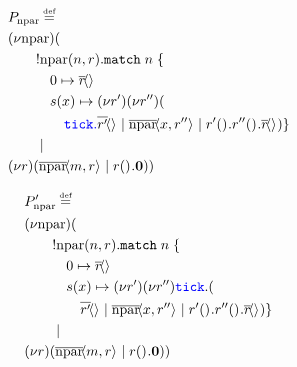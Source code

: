 \begin{minipage}{0.42\textwidth}
\begin{align*}
    &\kern0em P_{\text{npar}} \defeq\\
    &(\nu \text{npar})(\\
    &\kern2em !\text{npar}(n,r).\texttt{match}\; n\; \{\\
    &\kern3em 0 \mapsto \asyncoutputch{r}{}{}\\
    &\kern3em s(x) \mapsto (\nu r' )(\nu r'' )(\\
    &\kern4em {\color{blue} \tick{{\color{black} \asyncoutputch{r'}{}{}}} } \mid
 \asyncoutputch{\text{npar}}{x,r''}{} \mid \inputch{r'}{}{}{\inputch{r''}{}{}{\asyncoutputch{r}{}{}}}) \} \\
    &\kern2em \mid \\
    &(\nu r)( \asyncoutputch{\text{npar}}{m,r}{} \mid \inputch{r}{}{}{\nil} ))
\end{align*}
\end{minipage}
\begin{minipage}{0.42\textwidth}
\begin{align*}
    &\kern0em P_{\text{npar}}' \defeq\\
    &(\nu \text{npar})(\\
    &\kern2em !\text{npar}(n,r).\texttt{match}\; n\; \{\\
    &\kern3em 0 \mapsto \asyncoutputch{r}{}{}\\
    &\kern3em s(x) \mapsto (\nu r' )(\nu r'' ) {\color{blue}\texttt{tick}}. (\\ &\kern4em {\asyncoutputch{r'}{}{}} \mid
 \asyncoutputch{\text{npar}}{x,r''}{} \mid \inputch{r'}{}{}{\inputch{r''}{}{}{\asyncoutputch{r}{}{}}}) \} \\
    &\kern2em \mid \\
    &(\nu r)( \asyncoutputch{\text{npar}}{m,r}{} \mid \inputch{r}{}{}{\nil} ))
\end{align*}
\end{minipage}\\

